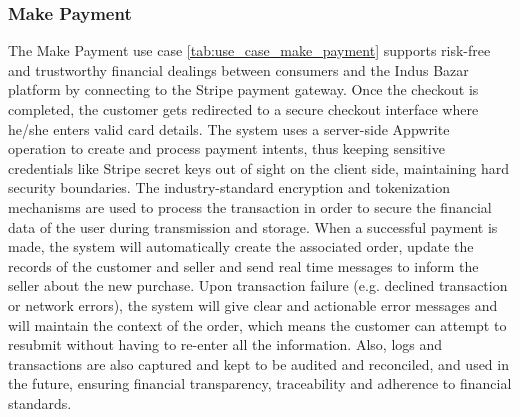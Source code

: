 \subsubsection{Make Payment}
The Make Payment use case \ref{tab:use_case_make_payment} supports risk-free and trustworthy financial dealings between consumers and the Indus Bazar platform by connecting to the Stripe payment gateway. Once the checkout is completed, the customer gets redirected to a secure checkout interface where he/she enters valid card details. The system uses a server-side Appwrite operation to create and process payment intents, thus keeping sensitive credentials like Stripe secret keys out of sight on the client side, maintaining hard security boundaries. The industry-standard encryption and tokenization mechanisms are used to process the transaction in order to secure the financial data of the user during transmission and storage. When a successful payment is made, the system will automatically create the associated order, update the records of the customer and seller and send real time messages to inform the seller about the new purchase. Upon transaction failure (e.g. declined transaction or network errors), the system will give clear and actionable error messages and will maintain the context of the order, which means the customer can attempt to resubmit without having to re-enter all the information. Also, logs and transactions are also captured and kept to be audited and reconciled, and used in the future, ensuring financial transparency, traceability and adherence to financial standards.

